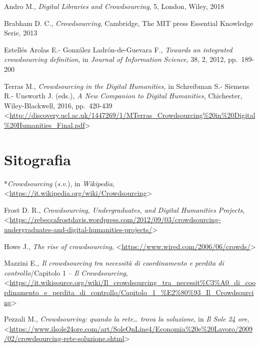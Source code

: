 \documentclass[
  b5paper,
  twoside,
  11pt,
  chapterprefix=false,
  bibliography=totocnumbered,
  parskip=0]{scrbook}
\begin{document}
Andro M., \emph{Digital Libraries and Crowdsourcing}, 5, London, Wiley, 2018

Brabham D. C., \emph{Crowdsourcing}, Cambridge, The MIT press Essential
Knowledge Serie, 2013

Estellés Arolas E.- González Ladrón-de-Guevara F., \emph{Towards an
integrated crowdsourcing definition}, in \emph{Journal of Information
Science}, 38, 2, 2012, pp.~189-200

Terras M., \emph{Crowdsourcing in the Digital Humanities,} in Schreibman S.-
Siemens R.- Unsworth J. (eds.), \emph{A New Companion to Digital Humanities},
Chichester, Wiley-Blackwell, 2016, pp.~420-439
\textless{}\href{http://discovery.ucl.ac.uk/1447269/1/MTerras_Crowdsourcing\%20in\%20Digital\%20Humanities_Final.pdf}{{http://discovery.ucl.ac.uk/1447269/1/MTerras\_Crowdsourcing\%20in\%20Digital\%20Humanities\_Final.pdf}}\textgreater{}

\hypertarget{sitografia-5}{%
\section*{Sitografia}\label{sitografia-5}}

*\emph{Crowdsourcing} (\emph{s.v}.), in \emph{Wikipedia},
\textless{}{\url{https://it.wikipedia.org/wiki/Crowdsourcing}\textgreater{}}

Frost D. R., \emph{Crowdsourcing, Undergraduates, and Digital Humanities
Projects},
\textless{}{\url{https://rebeccafrostdavis.wordpress.com/2012/09/03/crowdsourcing-undergraduates-and-digital-humanities-projects/}\textgreater{}}

Howe J., \emph{The rise of crowdsourcing},
\textless{}{\url{https://www.wired.com/2006/06/crowds/}\textgreater{}}

Mazzini E.\emph{, Il crowdsourcing tra necessità di coordinamento e perdita
di controllo}/Capitolo 1 -- \emph{Il Crowdsourcing},
\textless{}{\href{https://it.wikisource.org/wiki/Il_crowdsourcing_tra_necessità_di_coordinamento_e_perdita_di_controllo/Capitolo_1_–_Il_Crowdsourcing}{https://it.wikisource.org/wiki/Il\_crowdsourcing\_tra\_necessit\%C3\%A0\_di\_coordinamento\_e\_perdita\_di\_controllo/Capitolo\_1\_\%E2\%80\%93\_Il\_Crowdsourcing}\textgreater{}}

Pezzali M., \emph{Crowdsourcing: quando la rete\ldots{} trova la soluzione}, in
\emph{Il Sole 24 ore},
\textless{}{\url{https://www.ilsole24ore.com/art/SoleOnLine4/Economia\%20e\%20Lavoro/2009/02/crowdsourcing-rete-soluzione.shtml}\textgreater{}}
\end{document}
